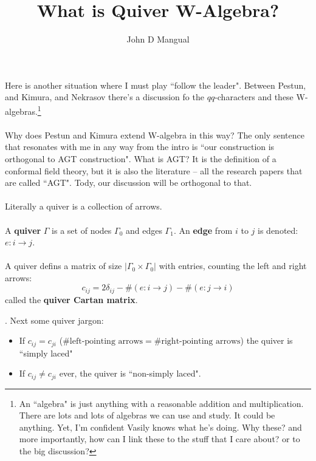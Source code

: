\documentclass[12pt]{article}
\title{What is Quiver W-Algebra?}
\author{John D Mangual}
\date{}
\begin{document}
\selectfont \fontsize{12.5}{15}\selectfont

\maketitle

\noindent Here is another situation where I must play ``follow the leader".  Between Pestun, and Kimura, and Nekrasov there's a discussion fo the $qq$-characters and these W-algebras.\footnote{An ``algebra" is just anything with a reasonable addition and multiplication. There are lots and lots of algebras we can use and study. It could be anything.  Yet, I'm confident Vasily knows what he's doing.  Why these?  and more importantly, how can I link these to the stuff that I care about? or to the big discussion?} \\ \\
Why does Pestun and Kimura extend W-algebra in this way?  The only sentence that resonates with me in any way from the intro is ``{\color{red!50!orange}our construction is orthogonal to AGT construction}".  What is AGT?  It is the definition of a conformal field theory, but it is also the literature -- all the research papers that are called ``AGT".  Tody, our discussion will be orthogonal to that. \\ \\
Literally a quiver is a collection of arrows. \\ \\ 
A \textbf{quiver} $\Gamma$ is a set of nodes $\Gamma_0$ and edges $\Gamma_1$.  An \textbf{edge}  from $i$ to $j$ is denoted: $e: i \to j$. \\ \\
A quiver defins a matrix of size $|\Gamma_0 \times \Gamma_0|$ with entries, counting the left and right arrows:
$$ c_{ij} = 2 \delta_{ij} - \# (e: i \to j) - \# (e: j \to i) $$
called the \textbf{quiver Cartan matrix}. 
.  Next some quiver jargon:
\begin{itemize}
\item If $c_{ij} = c_{ji}$ ($\# \text{left-pointing arrows}=\# \text{right-pointing arrows}$) the quiver is ``simply laced"
\item If $c_{ij} \neq c_{ji}$ ever, the quiver is ``non-simply laced". 
\end{itemize}
\end{document}
